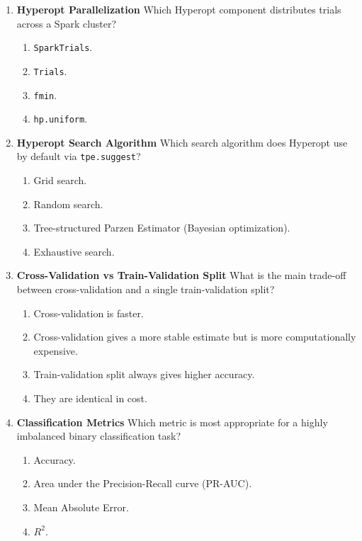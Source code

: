 \documentclass{article}
\begin{document}
\begin{enumerate}[label=\textbf{Q\arabic*.}]
		\item \textbf{Hyperopt Parallelization}
		Which Hyperopt component distributes trials across a Spark cluster?
		\begin{enumerate}[label=\Alph*.]
			\item \texttt{SparkTrials}.
			\item \texttt{Trials}.
			\item \texttt{fmin}.
			\item \texttt{hp.uniform}.
		\end{enumerate}
		
		\item \textbf{Hyperopt Search Algorithm}
		Which search algorithm does Hyperopt use by default via \texttt{tpe.suggest}?
		\begin{enumerate}[label=\Alph*.]
			\item Grid search.
			\item Random search.
			\item Tree-structured Parzen Estimator (Bayesian optimization).
			\item Exhaustive search.
		\end{enumerate}
		
		\item \textbf{Cross-Validation vs Train-Validation Split}
		What is the main trade-off between cross-validation and a single train-validation split?
		\begin{enumerate}[label=\Alph*.]
			\item Cross-validation is faster.
			\item Cross-validation gives a more stable estimate but is more computationally expensive.
			\item Train-validation split always gives higher accuracy.
			\item They are identical in cost.
		\end{enumerate}
		
		\item \textbf{Classification Metrics}
		Which metric is most appropriate for a highly imbalanced binary classification task?
		\begin{enumerate}[label=\Alph*.]
			\item Accuracy.
			\item Area under the Precision-Recall curve (PR-AUC).
			\item Mean Absolute Error.
			\item $R^2$.
		\end{enumerate}
		

\end{enumerate}
\end{document}
